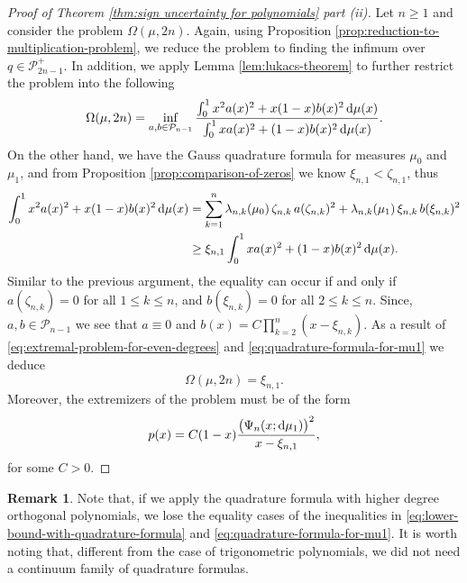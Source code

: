\documentclass[reqno, a4paper]{amsart}
\renewcommand{\d}{\text{\rm d}}
\theoremstyle{plain}
\theoremstyle{definition}
\theoremstyle{remarkstyle}
\newtheorem*{remark}{Remark}
\numberwithin{equation}{section}
\begin{document}
\begin{proof}[Proof of Theorem \ref{thm:sign uncertainty for polynomials} part \textnormal{(ii)}]

Let $n\geq 1$ and consider the problem $\Omega(\mu, 2n)$. Again, using Proposition \ref{prop:reduction-to-multiplication-problem}, we reduce the problem to finding the infimum over $q\in \mathcal{P}_{2n-1}^+$. In addition, we apply Lemma \ref{lem:lukacs-theorem} to further restrict the problem into the following
\begin{equation}\label{eq:extremal-problem-for-even-degrees}
    \Omega(\mu, 2n)=\inf_{a, b\in \mathcal{P}_{n-1}} \frac{\int_{0}^{1} x^2 a(x)^2 +x(1-x) b(x)^2\, \d\mu(x)}{\int_{0}^{1}x a(x)^2 + (1-x) b(x)^2\, \d\mu(x)}. 
\end{equation}
On the other hand, we have the Gauss quadrature formula for measures $\mu_0$ and $\mu_1$, and from Proposition \ref{prop:comparison-of-zeros} we know $\xi_{n, 1}<\zeta_{n,1}$, thus 
\begin{equation}\label{eq:quadrature-formula-for-mu1}
\begin{split}
    \int_{0}^{1} x^2 a(x)^2 +x(1-x) b(x)^2\, \d\mu(x)&=\sum_{k=1}^{n}\lambda_{n, k}(\mu_0) \,\zeta_{n, k}\, a(\zeta_{n, k})^2+\lambda_{n, k}(\mu_1) \,\xi_{n, k}\, b(\xi_{n, k})^2\\
    &\geq \xi_{n, 1} \int_{0}^1 x a(x)^2 + (1-x) b(x)^2\, \d\mu(x).
\end{split}
\end{equation}
Similar to the previous argument, the equality can occur if and only if 
$a(\zeta_{n, k})=0$ for all $1\leq k\leq n$, and $b(\xi_{n, k})=0$ for all $2\leq k\leq n$. Since, $a, b\in \mathcal{P}_{n-1}$ we see that $a\equiv 0$ and $b(x)=C\prod_{k=2}^{n}(x-\xi_{n, k})$. As a result of \eqref{eq:extremal-problem-for-even-degrees} and \eqref{eq:quadrature-formula-for-mu1} we deduce 
\begin{equation*}
    \Omega(\mu, 2n)=\xi_{n, 1}.
\end{equation*}
Moreover, the extremizers of the problem must be of the form 
\begin{equation*}
    p(x)=C(1-x)\frac{\bigl(\Psi_n(x;\d\mu_1)\bigr)^2}{x-\xi_{n,1}},
\end{equation*}
for some $C>0$.
\end{proof}

\begin{remark}
    Note that, if we apply the quadrature formula with higher degree orthogonal polynomials, we lose the equality cases of the inequalities in \eqref{eq:lower-bound-with-quadrature-formula} and \eqref{eq:quadrature-formula-for-mu1}. It is worth noting that, different from the case of trigonometric polynomials, we did not need a continuum family of quadrature formulas. 
\end{remark}
\end{document}
